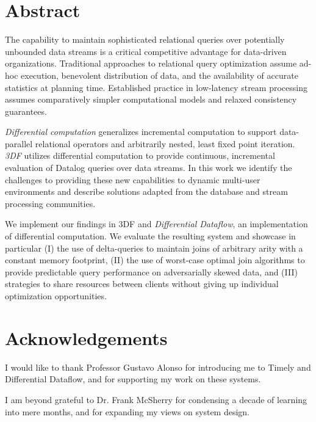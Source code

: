 \documentclass{article}
\begin{document}
\tableofcontents

\newpage

\section{Abstract} \label{abstract}

The capability to maintain sophisticated relational queries over
potentially unbounded data streams is a critical competitive advantage
for data-driven organizations. Traditional approaches to relational
query optimization assume ad-hoc execution, benevolent distribution of
data, and the availability of accurate statistics at planning
time. Established practice in low-latency stream processing assumes
comparatively simpler computational models and relaxed consistency
guarantees.

\emph{Differential computation} generalizes incremental computation to
support data-parallel relational operators and arbitrarily nested,
least fixed point iteration. \emph{3DF} utilizes differential
computation to provide continuous, incremental evaluation of Datalog
queries over data streams. In this work we identify the challenges to
providing these new capabilities to dynamic multi-user environments
and describe solutions adapted from the database and stream processing
communities.

We implement our findings in 3DF and \emph{Differential Dataflow}, an
implementation of differential computation. We evaluate the resulting
system and showcase in particular (I) the use of delta-queries to
maintain joins of arbitrary arity with a constant memory footprint,
(II) the use of worst-case optimal join algorithms to provide
predictable query performance on adversarially skewed data, and (III)
strategies to share resources between clients without giving up
individual optimization opportunities.

\newpage

\section*{Acknowledgements}

I would like to thank Professor Gustavo Alonso for introducing me to
Timely and Differential Dataflow, and for supporting my work on these
systems.

I am beyond grateful to Dr. Frank McSherry for condensing a decade of
learning into mere months, and for expanding my views on system
design.
\end{document}
